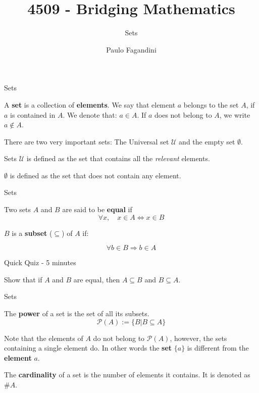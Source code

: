 \documentclass[aspectratio=169]{beamer}
\title[]{4509 - Bridging Mathematics}
\subtitle{Sets}
\author[P. Fagandini]{Paulo Fagandini}
\institute{}
\date{}
\begin{document}
\begin{frame}{Sets}

A \textbf{set} is a collection of \textbf{elements}. We say that element $a$ belongs to the set $A$, if $a$ is contained in $A$. We denote that: $a\in A$. If $a$ does not belong to $A$, we write $a\notin A$.\pause

\vspace{0.5cm}
There are two very important sets: The Universal set $\mathcal{U}$ and the empty set $\emptyset$.
    
\end{frame}

\begin{frame}{Sets}
    $\mathcal{U}$ is defined as the set that contains all the \emph{relevant} elements.
    
    \vspace{1cm}
    
    $\emptyset$ is defined as the set that does not contain any element.

    
\end{frame}

\begin{frame}{Sets}

    \begin{definition}
    Two sets $A$ and $B$ are said to be \textbf{equal} if $$\forall x,\quad x\in A\Leftrightarrow x\in  B$$
    \end{definition}

    \vspace{1cm}
    
    \begin{definition}
    
    $B$ is a \textbf{subset} ($\subseteq$) of $A$ if:
    
    $$\forall b\in B\Rightarrow b\in A$$
    \end{definition}
    
\end{frame}

\begin{frame}{Quick Quiz - 5 minutes}
    
    Show that if $A$ and $B$ are equal, then $A\subseteq B$ and $B\subseteq A$.
    
\end{frame}

\begin{frame}{Sets}
    \begin{definition}
        The \textbf{power} of a set is the set of all its subsets.
        $$\mathcal{P}(A):=\{B|B\subseteq A\}$$
    \end{definition}
    
    Note that the elements of $A$ do not belong to $\mathcal{P}(A)$, however, the sets containing a single element do. In other words the \textbf{set} $\{a\}$ is different from the \textbf{element} $a$.

    \begin{definition}
        The \textbf{cardinality} of a set is the number of elements it contains. It is denoted as $\#A$.
    \end{definition}

\end{frame}
\end{document}
